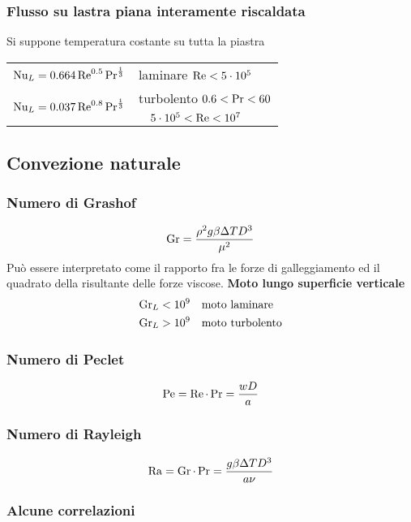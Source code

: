 \subsubsection{Flusso su lastra piana interamente riscaldata}
Si suppone temperatura costante su tutta la piastra
\begin{tabular}{ll}
$\operatorname{Nu}_{L} = 0.664 \operatorname{Re}^{0.5} \operatorname{Pr}^{\frac{1}{3}}$ & laminare $\operatorname{Re} < 5\cdot10^5$\\
\multirow{2}{*}{$\operatorname{Nu}_{L} = 0.037 \operatorname{Re}^{0.8} \operatorname{Pr}^{\frac{1}{3}}$} & turbolento $0.6 < \operatorname{Pr} < 60$\\
& $\quad 5 \cdot 10^5 < \operatorname{Re} < 10^7$\\
\end{tabular}

\subsection{Convezione naturale}
\subsubsection{Numero di Grashof}
\[  \operatorname{Gr} = \frac{\rho^2 g \beta \Delta T D^3}{\mu^2} \]
Può essere interpretato come il rapporto fra le forze di galleggiamento ed il quadrato della risultante delle forze viscose.
\textbf{Moto lungo superficie verticale}\\
\begin{align*}
    \operatorname{Gr}_{L} < 10^9 & \quad \text{moto laminare} \\
    \operatorname{Gr}_{L} > 10^9 & \quad \text{moto turbolento} \\
\end{align*} 

\subsubsection{Numero di Peclet}
\[ \operatorname{Pe} = \operatorname{Re} \cdot \operatorname{Pr} = \frac{w D}{a} \]

\subsubsection{Numero di Rayleigh}
\[ \operatorname{Ra} = \operatorname{Gr} \cdot \operatorname{Pr} = \frac{g \beta \Delta T D^3}{a \nu} \]

\subsubsection{Alcune correlazioni}

